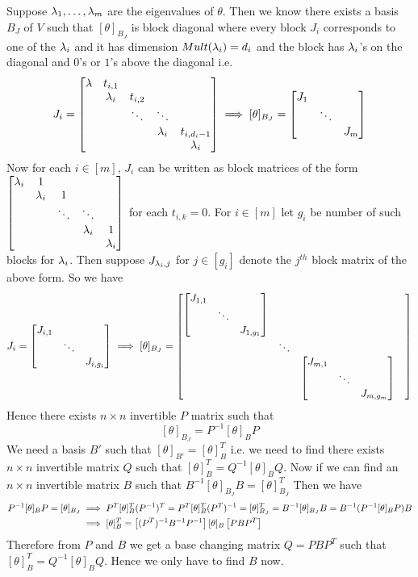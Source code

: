 \documentclass[a4paper, 11pt]{article}
\begin{document}
{Suppose $\lambda_1,\dots, \lambda_m$ are the eigenvalues of $\theta$. Then we know there exists a basis $B_J$ of $V$ such that $[\theta]_{B_J}$ is block diagonal where every block $J_{i}$ corresponds to one of the $\lambda_i$ and it has dimension $Mult(\lambda_i)=d_i$ and the block has $\lambda_i$'s on the diagonal and $0$'s or $1$'s above the diagonal i.e. $$J_i=\left[\begin{matrix}\lambda & t_{i,1} & & &\\ & \lambda_i & t_{i,2} & & \\ &  & \ddots & \ddots & \\  & & & \lambda_i & t_{i,d_i-1} \\ & & & & \lambda_i\end{matrix}\right]\implies [\theta]_{B_J}=\left[\begin{matrix}J_1 & & \\ & \ddots & \\ & & J_m\end{matrix}\right]$$Now for each $i\in[m]$, $J_i$ can be written as block matrices of the form $\left[\begin{matrix}\lambda_i & 1   &        & & \\
	& \lambda_i & 1      & &\\
	&     & \ddots & \ddots &\\
	&      &        &        \lambda_i& 1\\
	&       &        &         & \lambda_i\end{matrix}\right]$ for each $t_{i,k}=0$. For $i\in[m]$ let $g_i$ be number of such blocks for $\lambda_i$. Then suppose $J_{\lambda_i, j}$ for $j\in[g_i]$ denote the $j^{th}$ block matrix of the above form. So we have $$J_i=\left[\begin{matrix}J_{i,1} & & \\ & \ddots & \\ & & J_{i,g_i}\end{matrix}\right]\implies [\theta]_{B_J}=
\left[\begin{matrix}\left[\begin{matrix}J_{1,1} & & \\ & \ddots & \\ & & J_{1,g_1}\end{matrix}\right] & &  \\
   & \ddots&  &  \\
& &  \left[\begin{matrix}J_{m,1} & & \\ & \ddots & \\ & & J_{m,g_{m}}\end{matrix}\right] \end{matrix}\right]
$$
Hence there exists $n\times n$ invertible $P$ matrix such that $$[\theta]_{B_J}=P^{-1}[\theta]_{B}P$$We need a basis $B'$ such that $[\theta]_{B'}=[\theta]_B^T$ i.e. we need to find there exists $n\times n$ invertible matrix $Q$ such that $[\theta]_{B}^T=Q^{-1}[\theta]_BQ$. Now if we can find an $n\times n$ invertible matrix $B$ such that $B^{-1}[\theta]_{B_J}B=[\theta]_{B_J}^T$ Then we have \begin{align*}
	P^{-1}[\theta]_{B}P=[\theta]_{B_J}& \implies P^T[\theta]_B^T(P^{-1})^T=P^T[\theta]_B^T(P^T)^{-1}=[\theta]_{B_J}^T=B^{-1}[\theta]_{B_J}B=B^{-1}(P^{-1}[\theta]_{B}P)B\\
	& \implies [\theta]_B^T=\left[(P^T)^{-1}B^{-1}P^{-1}\right][\theta]_B\left[ PBP^T\right]
\end{align*}Therefore from $P$ and $B$ we get a base changing matrix $Q=PBP^T$ such that $[\theta]_{B}^T=Q^{-1}[\theta]_BQ$. Hence we only have to find $B$ now. 

}
\end{document}
